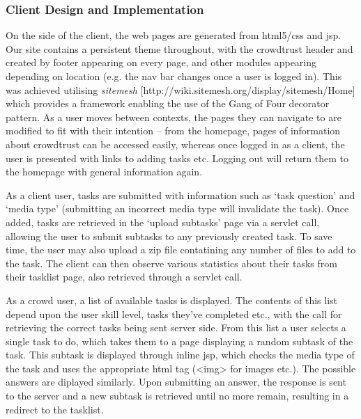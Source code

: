 \documentclass[11pt]{article}
\begin{document}
\subsubsection{Client Design and Implementation}
On the side of the client, the web pages are generated from html5/css and jsp. 
Our site contains a persistent theme throughout, with the crowdtrust header and
created by footer appearing on every page, and other modules appearing depending
on location (e.g. the nav bar changes once a user is logged in). This was achieved
utilising \emph{sitemesh} [http://wiki.sitemesh.org/display/sitemesh/Home]
which provides a framework enabling the use of the Gang of Four decorator pattern.
As a user moves between contexts, the pages they can navigate to are modified
to fit with their intention -- from the homepage, pages of information about
crowdtrust can be accessed easily, whereas once logged in as a client, the user
is presented with links to adding tasks etc. Logging out will return them to
the homepage with general information again.

As a client user, tasks are submitted with information such as `task question'
and `media type' (submitting an incorrect media type will invalidate the task).
Once added, tasks are retrieved in the `upload subtasks' page via a servlet call,
allowing the user to submit subtasks to any previously created task. To save time,
the user may also upload a zip file contatining any number of files to add to the task.
The client can then observe various statistics about their tasks from their tasklist page,
also retrieved through a servlet call.

As a crowd user, a list of available tasks is displayed. The
contents of this list depend upon the user skill level, tasks they've completed
etc., with the call for retrieving the correct tasks being sent server side. From
this list a user selects a single task to do, which takes them to a page displaying
a random subtask of the task. This subtask is displayed through inline jsp, which
checks the media type of the task and uses the appropriate html tag (<img> for images etc.).
The possible answers are diplayed similarly. Upon submitting an answer, the response
is sent to the server and a new subtask is retrieved until no more remain, resulting
in a redirect to the tasklist.
\end{document}
